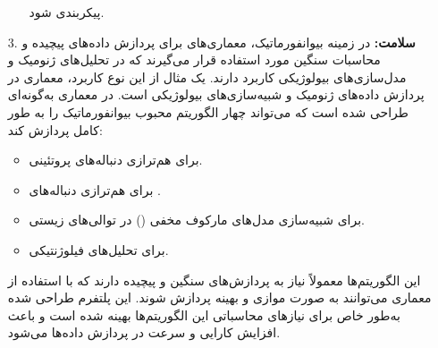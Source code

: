 \begin{qsolve}
	\begin{enumerate}
		\item [ ]
		\begin{itemize}
			\item [ ]
			پیکربندی شود.
		\end{itemize}
		
		
		
		\item [3. ]
		\textbf{سلامت: }
		در زمینه بیوانفورماتیک، معماری‌های  برای پردازش داده‌های پیچیده و محاسبات سنگین مورد استفاده قرار می‌گیرند که در تحلیل‌های ژنومیک و مدل‌سازی‌های بیولوژیکی کاربرد دارند. یک مثال از این نوع کاربرد، معماری  در پردازش داده‌های ژنومیک و شبیه‌سازی‌های بیولوژیکی است. در \cite{ref6} معماری  به‌گونه‌ای طراحی شده است که می‌تواند چهار الگوریتم محبوب بیوانفورماتیک را به طور کامل پردازش کند:
		
		\begin{itemize}
			\item 
			 برای هم‌ترازی دنباله‌های پروتئینی.
			
			\item 
			 برای هم‌ترازی دنباله‌های .
			
			\item 
			 برای شبیه‌سازی مدل‌های مارکوف مخفی () در توالی‌های زیستی.
			
			\item 
			 برای تحلیل‌های فیلوژنتیکی.
		\end{itemize}
		
		این الگوریتم‌ها معمولاً نیاز به پردازش‌های سنگین و پیچیده دارند که با استفاده از معماری  می‌توانند به صورت موازی و بهینه پردازش شوند. این پلتفرم طراحی شده به‌طور خاص برای نیازهای محاسباتی این الگوریتم‌ها بهینه شده است و باعث افزایش کارایی و سرعت در پردازش داده‌ها می‌شود.
	\end{enumerate}
\end{qsolve}




